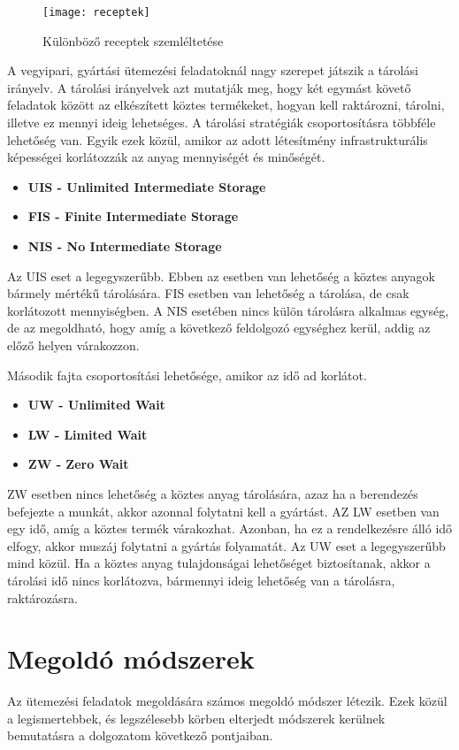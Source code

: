 \begin{figure}[H]	
\begin{center}
\texttt{[image: receptek]}
\caption{Különböző receptek szemléltetése}
\label{receptek}
\end{center}
\end{figure}
\newpage
A vegyipari, gyártási ütemezési feladatoknál nagy szerepet játszik a tárolási irányelv. A tárolási irányelvek azt mutatják meg, hogy két egymást követő feladatok között az elkészített köztes termékeket, hogyan kell raktározni, tárolni, illetve ez mennyi ideig lehetséges. A tárolási stratégiák csoportosításra többféle lehetőség van. Egyik ezek közül, amikor az adott létesítmény infrastrukturális képességei korlátozzák az anyag mennyiségét és minőségét.
\begin{itemize}
	\item \textbf{UIS - Unlimited Intermediate Storage}
	\item \textbf{FIS - Finite Intermediate Storage}
	\item \textbf{NIS - No Intermediate Storage}
\end{itemize}
Az UIS eset a legegyszerűbb. Ebben az esetben van lehetőség a köztes anyagok bármely mértékű tárolására. FIS esetben van lehetőség a tárolása, de csak korlátozott mennyiségben. A NIS esetében nincs külön tárolásra alkalmas egység, de az megoldható, hogy amíg a következő feldolgozó egységhez kerül, addig az előző helyen várakozzon.

Második fajta csoportosítási lehetősége, amikor az idő ad korlátot.
\begin{itemize}
	\item \textbf{UW - Unlimited Wait}
	\item \textbf{LW - Limited Wait}
	\item \textbf{ZW - Zero Wait}	
\end{itemize}
ZW esetben nincs lehetőség a köztes anyag tárolására, azaz ha a berendezés befejezte a munkát, akkor azonnal folytatni kell a gyártást. AZ LW esetben van egy idő, amíg a köztes termék várakozhat. Azonban, ha ez a rendelkezésre álló idő elfogy, akkor muszáj folytatni a gyártás folyamatát. Az UW eset a legegyszerűbb mind közül. Ha a köztes anyag tulajdonságai lehetőséget biztosítanak, akkor a tárolási idő nincs korlátozva, bármennyi ideig lehetőség van a tárolásra, raktározásra.
\newpage
\section{Megoldó módszerek}
Az ütemezési feladatok megoldására számos megoldó módszer létezik. Ezek közül a legismertebbek, és legszélesebb körben elterjedt módszerek kerülnek bemutatásra a dolgozatom következő pontjaiban.
